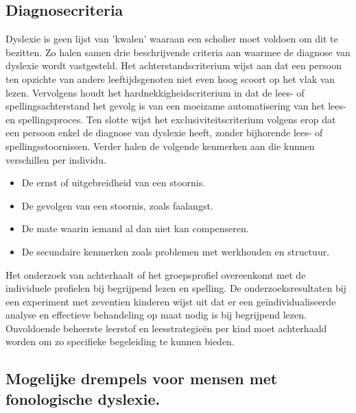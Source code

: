 \subsection{Diagnosecriteria}

Dyslexie is geen lijst van 'kwalen' waaraan een scholier moet voldoen om dit te bezitten. Zo halen \textcite{Kleijnen2008, Ghesquiere2018} samen drie beschrijvende criteria aan waarmee de diagnose van dyslexie wordt vastgesteld. Het achterstandscriterium wijst aan dat een persoon ten opzichte van andere leeftijdsgenoten niet even hoog scoort op het vlak van lezen. Vervolgens houdt het hardnekkigheidscriterium in dat de lees- of spellingsachterstand het gevolg is van een moeizame automatisering van het lees- en spellingsproces. Ten slotte wijst het exclusiviteitscriterium volgens \textcite{Ghesquiere2018} erop dat een persoon enkel de diagnose van dyslexie heeft, zonder bijhorende lees- of spellingsstoornissen. Verder halen \textcite{VanVreckem2015, Ghesquiere2018} de volgende kenmerken aan die kunnen verschillen per individu.

\begin{itemize}
	\item De ernst of uitgebreidheid van een stoornis.
	\item De gevolgen van een stoornis, zoals faalangst.
	\item De mate waarin iemand al dan niet kan compenseren.
	\item De secundaire kenmerken zoals problemen met werkhouden en structuur.
\end{itemize}

Het onderzoek van \textcite{VanVreckem2015} achterhaalt of het groepsprofiel overeenkomt met de individuele profielen bij begrijpend lezen en spelling. De onderzoeksresultaten bij een experiment met zeventien kinderen wijst uit dat er een geïndividualiseerde analyse en effectieve behandeling op maat nodig is bij begrijpend lezen. Onvoldoende beheerste leerstof en leesstrategieën per kind moet achterhaald worden om zo specifieke begeleiding te kunnen bieden.

\subsection{Mogelijke drempels voor mensen met fonologische dyslexie.}


